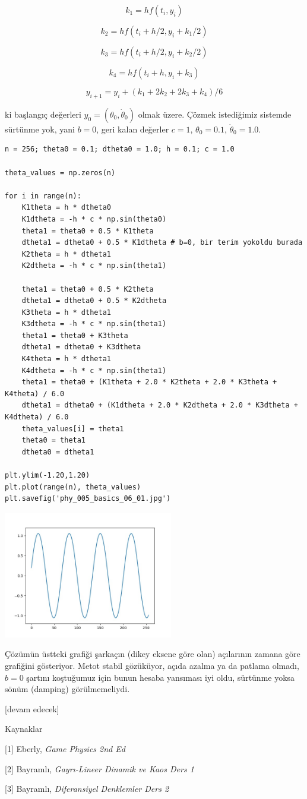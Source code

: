 \documentclass[12pt,fleqn]{article}\usepackage{../../common}
\begin{document}
$$
k_1 = h f(t_i, y_i)
$$

$$
k_2 = h f(t_i + h/2, y_i + k_1/2)
$$

$$
k_3 = h f(t_i + h/2, y_i + k_2/2)
$$

$$
k_4 = h f(t_i + h, y_i + k_3)
$$

$$
y_{i+1} = y_i + (k_1 + 2 k_2 + 2 k_3 + k_4) / 6
$$

ki başlangıç değerleri $y_0 = (\theta_0,\dot{\theta}_0)$ olmak üzere. Çözmek
istediğimiz sistemde sürtünme yok, yani $b=0$, geri kalan değerler $c=1$,
$\theta_0=0.1$, $\dot{\theta}_0 = 1.0$.


\begin{verbatim}
n = 256; theta0 = 0.1; dtheta0 = 1.0; h = 0.1; c = 1.0

theta_values = np.zeros(n)

for i in range(n):
    K1theta = h * dtheta0
    K1dtheta = -h * c * np.sin(theta0)
    theta1 = theta0 + 0.5 * K1theta
    dtheta1 = dtheta0 + 0.5 * K1dtheta # b=0, bir terim yokoldu burada
    K2theta = h * dtheta1
    K2dtheta = -h * c * np.sin(theta1)

    theta1 = theta0 + 0.5 * K2theta
    dtheta1 = dtheta0 + 0.5 * K2dtheta
    K3theta = h * dtheta1
    K3dtheta = -h * c * np.sin(theta1)
    theta1 = theta0 + K3theta
    dtheta1 = dtheta0 + K3dtheta
    K4theta = h * dtheta1
    K4dtheta = -h * c * np.sin(theta1)
    theta1 = theta0 + (K1theta + 2.0 * K2theta + 2.0 * K3theta + K4theta) / 6.0
    dtheta1 = dtheta0 + (K1dtheta + 2.0 * K2dtheta + 2.0 * K3dtheta + K4dtheta) / 6.0
    theta_values[i] = theta1
    theta0 = theta1
    dtheta0 = dtheta1

plt.ylim(-1.20,1.20)
plt.plot(range(n), theta_values)
plt.savefig('phy_005_basics_06_01.jpg')
\end{verbatim}

\includegraphics[width=20em]{phy_005_basics_06_01.jpg}

Çözümün üstteki grafiği şarkaçın (dikey eksene göre olan) açılarının zamana göre
grafiğini gösteriyor. Metot stabil gözüküyor, açıda azalma ya da patlama olmadı,
$b=0$ şartını koştuğumuz için bunun hesaba yansıması iyi oldu, sürtünme yoksa
sönüm (damping) görülmemeliydi. 










[devam edecek]

Kaynaklar

[1] Eberly, {\em Game Physics 2nd Ed}

[2] Bayramlı, {\em Gayrı-Lineer Dinamik ve Kaos Ders 1}

[3] Bayramlı, {\em Diferansiyel Denklemler Ders 2}
\end{document}
